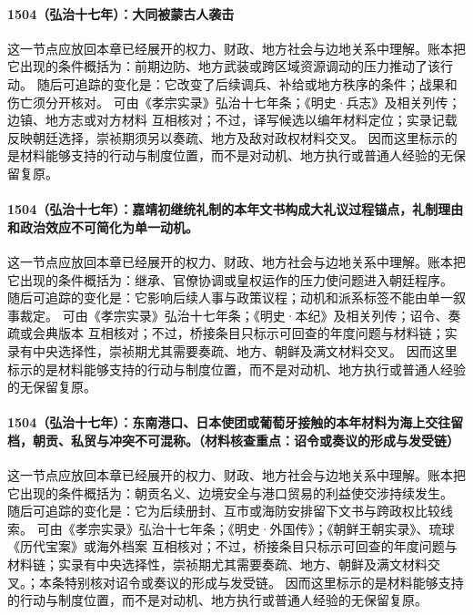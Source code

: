 \paragraph{1504（弘治十七年）：大同被蒙古人袭击} 这一节点应放回本章已经展开的权力、财政、地方社会与边地关系中理解。账本把它出现的条件概括为：前期边防、地方武装或跨区域资源调动的压力推动了该行动。 随后可追踪的变化是：它改变了后续调兵、补给或地方秩序的条件；战果和伤亡须分开核对。 可由《孝宗实录》弘治十七年条；《明史·兵志》及相关列传；边镇、地方志或对方材料 互相核对；不过，译写候选以编年材料定位；实录记载反映朝廷选择，崇祯期须另以奏疏、地方及敌对政权材料交叉。 因而这里标示的是材料能够支持的行动与制度位置，而不是对动机、地方执行或普通人经验的无保留复原。

\paragraph{1504（弘治十七年）：嘉靖初继统礼制的本年文书构成大礼议过程锚点，礼制理由和政治效应不可简化为单一动机。} 这一节点应放回本章已经展开的权力、财政、地方社会与边地关系中理解。账本把它出现的条件概括为：继承、官僚协调或皇权运作的压力使问题进入朝廷程序。 随后可追踪的变化是：它影响后续人事与政策议程；动机和派系标签不能由单一叙事裁定。 可由《孝宗实录》弘治十七年条；《明史·本纪》及相关列传；诏令、奏疏或会典版本 互相核对；不过，桥接条目只标示可回查的年度问题与材料链；实录有中央选择性，崇祯期尤其需要奏疏、地方、朝鲜及满文材料交叉。 因而这里标示的是材料能够支持的行动与制度位置，而不是对动机、地方执行或普通人经验的无保留复原。

\paragraph{1504（弘治十七年）：东南港口、日本使团或葡萄牙接触的本年材料为海上交往留档，朝贡、私贸与冲突不可混称。（材料核查重点：诏令或奏议的形成与发受链）} 这一节点应放回本章已经展开的权力、财政、地方社会与边地关系中理解。账本把它出现的条件概括为：朝贡名义、边境安全与港口贸易的利益使交涉持续发生。 随后可追踪的变化是：它为后续册封、互市或海防安排留下文书与跨政权比较线索。 可由《孝宗实录》弘治十七年条；《明史·外国传》；《朝鲜王朝实录》、琉球《历代宝案》或海外档案 互相核对；不过，桥接条目只标示可回查的年度问题与材料链；实录有中央选择性，崇祯期尤其需要奏疏、地方、朝鲜及满文材料交叉。；本条特别核对诏令或奏议的形成与发受链。 因而这里标示的是材料能够支持的行动与制度位置，而不是对动机、地方执行或普通人经验的无保留复原。

